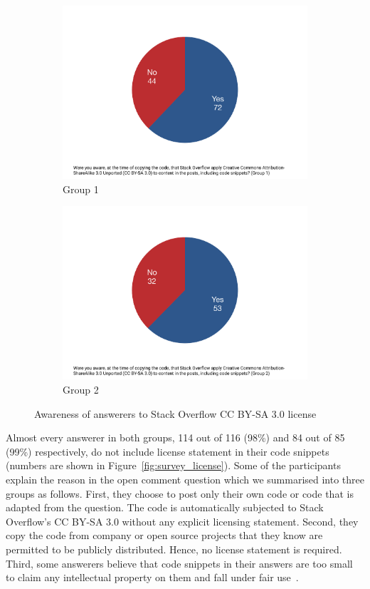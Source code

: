 \documentclass{svjour3}                     %
\begin{document}
\begin{figure}
	\begin{subfigure}{.5\textwidth}
		\centering
		\includegraphics[width=.4\linewidth]{survey_license_known_1}
		\caption{Group 1}
		\label{fig:survey_license_known_1}
	\end{subfigure}%
	\begin{subfigure}{.5\textwidth}
		\centering
		\includegraphics[width=.4\linewidth]{survey_license_known_2}
		\caption{Group 2}
		\label{fig:survey_license_known_2}
	\end{subfigure}
	\caption{Awareness of answerers to Stack Overflow CC BY-SA 3.0 license}
	\label{fig:survey_license_known}
\end{figure}

Almost every answerer in both groups, 114 out of 116 (98\%) and 84 out of 85
(99\%) respectively, do not include license statement in their code snippets
(numbers are shown in Figure~\ref{fig:survey_license}). Some of the participants
explain the reason in the open comment question which we summarised into three
groups as follows. First, they choose to post only their own code or code that
is adapted from the question. The code is automatically subjected to Stack
Overflow's CC BY-SA 3.0 without any explicit licensing statement. Second, they
copy the code from company or open source projects that they know are permitted
to be publicly distributed. Hence, no license statement is required. Third, some
answerers believe that code snippets in their answers are too small to claim any
intellectual property on them and fall under fair use~\citep{fairuse}.
\end{document}
